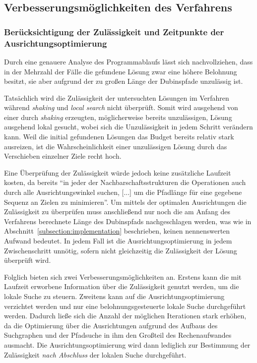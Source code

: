 \documentclass[12pt,a4paper,twoside]{article}
\theoremstyle{definition}
\numberwithin{equation}{section}
\begin{document}
\subsection{Verbesserungsmöglichkeiten des Verfahrens}\label{subsection:possibleImprovement}
\subsubsection{Berücksichtigung der Zulässigkeit und Zeitpunkte der Ausrichtungsoptimierung}\label{subsubsect:headingoptimization}
Durch eine genauere Analyse des Programmablaufs lässt sich nachvollziehen, dass in der Mehrzahl der Fälle die gefundene Lösung zwar eine höhere Belohnung besitzt, sie aber aufgrund der zu großen Länge der Dubinspfade unzulässig ist.

Tatsächlich wird die Zulässigkeit der untersuchten Lösungen im Verfahren während \textit{shaking} und \textit{local search} nicht überprüft. Somit wird ausgehend von einer durch \textit{shaking} erzeugten, möglicherweise bereits unzulässigen, Lösung ausgehend lokal gesucht, wobei sich die Unzulässigkeit in jedem Schritt verändern kann. Weil die initial gefundenen Lösungen das Budget bereits relativ stark ausreizen, ist die Wahrscheinlichkeit einer unzulässigen Lösung durch das Verschieben einzelner Ziele recht hoch.

Eine Überprüfung der Zulässigkeit würde jedoch keine zusätzliche Laufzeit kosten, da bereits "`in jeder der Nachbarschaftsstrukturen die Operationen auch durch alle Ausrichtungswinkel suchen, [...] um die Pfadlänge für eine gegebene Sequenz an Zielen zu minimieren"'\cite{R.Penicka.2017}. Um mittels der optimalen Ausrichtungen die Zulässigkeit zu überprüfen muss anschließend nur noch die am Anfang des Verfahrens berechnete Länge des Dubinspfads nachgeschlagen werden, was wie in Abschnitt~\ref{subsection:implementation} beschrieben, keinen nennenswerten Aufwand bedeutet.
In jedem Fall ist die Ausrichtungsoptimierung in jedem Zwischenschritt unnötig, sofern nicht gleichzeitig die Zulässigkeit der Lösung überprüft wird.

Folglich bieten sich zwei Verbesserungsmöglichkeiten an.
Erstens kann die mit Laufzeit erworbene Information über die Zulässigkeit genutzt werden, um die lokale Suche zu steuern.
Zweitens kann auf die Ausrichtungsoptimierung verzichtet werden und nur eine belohnungsgesteuerte lokale Suche durchgeführt werden. Dadurch ließe sich die Anzahl der möglichen Iterationen stark erhöhen, da die Optimierung über die Ausrichtungen aufgrund des Aufbaus des Suchgraphen und der Pfadsuche in ihm den Großteil des Rechenaufwandes ausmacht. Die Ausrichtungsoptimierung wird dann lediglich zur Bestimmung der Zulässigkeit \textit{nach Abschluss} der lokalen Suche durchgeführt.
\end{document}

